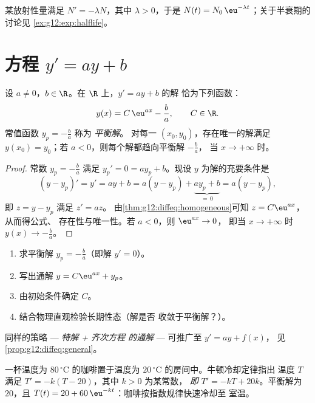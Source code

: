 \begin{example}[放射性衰变]\label{ex:g12:diffeq:decay}
某放射性量满足 $N' = -\lambda N$，其中 $\lambda > 0$，于是
$N(t) = N_0\,\eu^{-\lambda t}$；关于半衰期的讨论见
\cref{ex:g12:exp:halflife}。
\end{example}

\section{方程 \texorpdfstring{$y' = ay + b$}{y' = ay + b}}

\begin{theorem}[$y' = ay + b$ 的解]\label{thm:g12:diffeq:affine}
设 $a \neq 0$，$b \in \R$。在 $\R$ 上，$y' = ay + b$ 的解
恰为下列函数：
\[
y(x) = C\,\eu^{ax} - \frac{b}{a}, \qquad C \in \R .
\]
常值函数 $y_p = -\frac ba$ 称为 \emph{平衡解}。
对每一 $(x_0, y_0)$，存在唯一的解满足 $y(x_0) = y_0$；若
$a < 0$，则每个解都趋向平衡解 $-\frac ba$，
当 $x \to +\infty$ 时。
\end{theorem}

\begin{proof}
常数 $y_p = -\frac{b}{a}$ 满足 $y_p' = 0 = a y_p + b$。现设 $y$
为解的充要条件是
\[
(y - y_p)' = y' = ay + b = a(y - y_p) + \underbrace{a y_p + b}_{=\,0}
= a (y - y_p),
\]
即 $z = y - y_p$ 满足 $z' = az$。
由\cref{thm:g12:diffeq:homogeneous}可知 $z = C\eu^{ax}$，从而得公式、
存在性与唯一性。若 $a < 0$，则 $\eu^{ax} \to 0$，
即当 $x \to +\infty$ 时 $y(x) \to -\frac ba$。
\end{proof}

\begin{method}[由初始条件求解 $y' = ay + b$]\label{met:g12:diffeq:solve}
\begin{enumerate}
  \item 求平衡解 $y_p = -\frac{b}{a}$（即解 $y' = 0$）。
  \item 写出通解 $y = C\eu^{ax} + y_p$。
  \item 由初始条件确定 $C$。
  \item 结合物理直观检验长期性态（解是否
        收敛于平衡解？）。
\end{enumerate}
同样的策略 --- \emph{特解 + 齐次方程
的通解} --- 可推广至 $y' = ay + f(x)$，
见\cref{prop:g12:diffeq:general}。
\end{method}

\begin{example}[牛顿冷却定律]\label{ex:g12:diffeq:cooling}
一杯温度为 $80\,^\circ$C 的咖啡置于温度为 $20\,^\circ$C 的房间中。牛顿冷却定律指出
温度 $T$ 满足 $T' = -k(T - 20)$，其中 $k > 0$ 为某常数，
\emph{即} $T' = -kT + 20k$。平衡解为 $20$，且
$T(t) = 20 + 60\,\eu^{-kt}$：咖啡按指数规律快速冷却至
室温。
\end{example}

